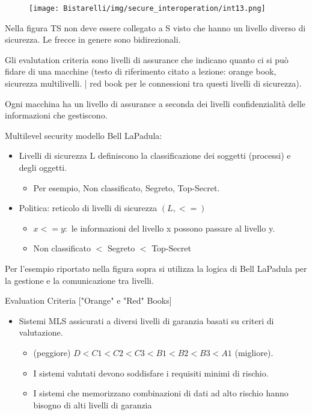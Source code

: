 \begin{figure}[H]
	\centering
    \texttt{[image: Bistarelli/img/secure\_interoperation/int13.png]}
\end{figure}

Nella figura TS non deve essere collegato a S visto che hanno un livello diverso di sicurezza. Le frecce in
genere sono bidirezionali.

\singlespacing

Gli evalutation criteria sono livelli di assurance che indicano quanto ci si può fidare di una macchine (testo di
riferimento citato a lezione: orange book, sicurezza multilivelli. | red book per le connessioni tra questi livelli di
sicurezza).

\singlespacing

Ogni macchina ha un livello di assurance a seconda dei livelli confidenzialità delle informazioni che gestiscono.

\singlespacing

Multilevel security modello Bell LaPadula:
\begin{itemize}
    \item Livelli di sicurezza L definiscono la classificazione dei soggetti (processi) e degli oggetti.
    
    \begin{itemize}
        \item Per esempio, Non classificato, Segreto, Top-Secret.
    \end{itemize}
    
    \item Politica: reticolo di livelli di sicurezza $(L,<=)$
    
     \begin{itemize}
        \item $x<=y:$ le informazioni del livello x possono passare al livello y.
        
        \item Non classificato $<$ Segreto $<$ Top-Secret
    \end{itemize}
\end{itemize}
Per l’esempio riportato nella figura sopra si utilizza la logica di Bell LaPadula per la gestione e la comunicazione
tra livelli.

\singlespacing

Evaluation Criteria ["Orange" e "Red" Books]
\begin{itemize}
    \item Sistemi MLS assicurati a diversi livelli di garanzia basati su criteri di valutazione.
    
    \begin{itemize}
        \item (peggiore) $D<C1<C2<C3<B1<B2<B3<A1$ (migliore).
        
        \item I sistemi valutati devono soddisfare i requisiti minimi di rischio.
        
        \item I sistemi che memorizzano combinazioni di dati ad alto rischio hanno bisogno di alti livelli di garanzia
    \end{itemize}
\end{itemize}

